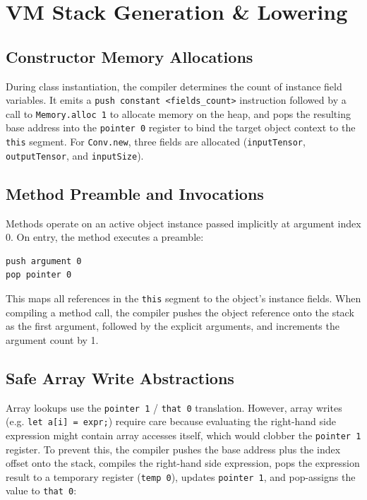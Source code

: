 \documentclass[11pt,a4paper]{article}
\begin{document}
\section{VM Stack Generation & Lowering}

\subsection{Constructor Memory Allocations}

During class instantiation, the compiler determines the count of instance field variables. It emits a \texttt{push constant <fields_count>} instruction followed by a call to \texttt{Memory.alloc 1} to allocate memory on the heap, and pops the resulting base address into the \texttt{pointer 0} register to bind the target object context to the \texttt{this} segment. For \texttt{Conv.new}, three fields are allocated (\texttt{inputTensor}, \texttt{outputTensor}, and \texttt{inputSize}).

\subsection{Method Preamble and Invocations}

Methods operate on an active object instance passed implicitly at argument index 0. On entry, the method executes a preamble:
\begin{lstlisting}[style=vmcode]
push argument 0
pop pointer 0
\end{lstlisting}
This maps all references in the \texttt{this} segment to the object's instance fields. When compiling a method call, the compiler pushes the object reference onto the stack as the first argument, followed by the explicit arguments, and increments the argument count by 1.

\subsection{Safe Array Write Abstractions}

Array lookups use the \texttt{pointer 1} / \texttt{that 0} translation. However, array writes (e.g. \texttt{let a[i] = expr;}) require care because evaluating the right-hand side expression might contain array accesses itself, which would clobber the \texttt{pointer 1} register. To prevent this, the compiler pushes the base address plus the index offset onto the stack, compiles the right-hand side expression, pops the expression result to a temporary register (\texttt{temp 0}), updates \texttt{pointer 1}, and pop-assigns the value to \texttt{that 0}:
\end{document}
